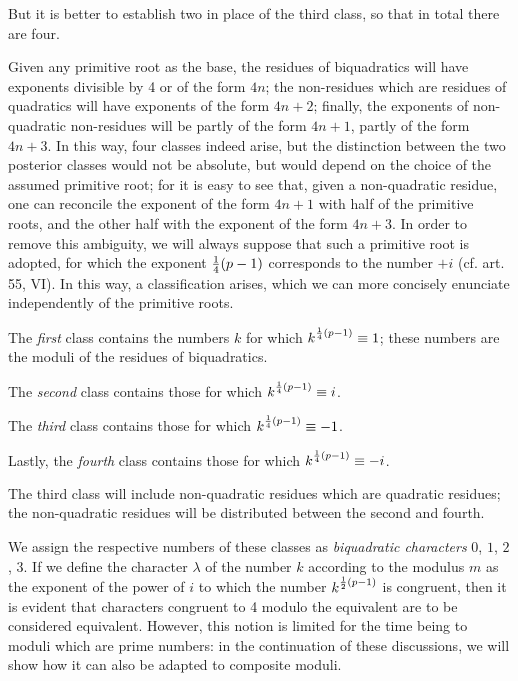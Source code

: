 \documentclass[twoside,12pt, showframe]{memoir}
\let\oldfrac\frac
\def\frac#1#2{\mathchoice{\tfrac{#1}{#2}}{\oldfrac{#1}{#2}}{\genfrac{}{}{}{2}{#1}{#2\mathstrut}}{\genfrac{}{}{}{3}{#1}{#2\mathstrut}}}
\begin{document}
But it is better to establish two in place of the third class, so that in total there are four.

Given any primitive root as the base, the residues of biquadratics will have exponents divisible by 4 or of the form \(4n\); the non-residues which are residues of quadratics will have exponents of the form \(4n+2\); finally, the exponents of non-quadratic non-residues will be partly of the form \(4n+1\), partly of the form \(4n+3\). In this way, four classes indeed arise, but the distinction between the two posterior classes would not be absolute, but would depend on the choice of the assumed primitive root; for it is easy to see that, given a non-quadratic residue, one can reconcile the exponent of the form \(4n+1\) with half of the primitive roots, and the other half with the exponent of the form \(4n+3\). In order to remove this ambiguity, we will always suppose that such a primitive root is adopted, for which the exponent \(\frac{1}{4}(p-1)\) corresponds to the number \(+i\) (cf. art. 55, VI). In this way, a classification arises, which we can more concisely enunciate independently of the primitive roots.

The \textit{first} class contains the numbers \(k\) for which \(k^{\frac{1}{4}(p-1)} \equiv 1\); these numbers are the moduli of the residues of biquadratics.

The \textit{second} class contains those for which \(k^{\frac{1}{4}(p-1)} \equiv i\).

The \textit{third} class contains those for which \(k^{\frac{1}{4}(p-1)} \equiv-1\).

Lastly, the \textit{fourth} class contains those for which \(k^{\frac{1}{4}(p-1)} \equiv-i\).

The third class will include non-quadratic residues which are quadratic residues; the non-quadratic residues will be distributed between the second and fourth.

We assign the respective numbers of these classes as \textit{biquadratic characters} \(0\), \(1\), \(2\), \(3\). If we define the character \(\lambda\) of the number \(k\) according to the modulus \(m\) as the exponent of the power of \(i\) to which the number \(k^{\frac{1}{2}(p-1)}\) is congruent, then it is evident that characters congruent to 4 modulo the equivalent are to be considered equivalent. However, this notion is limited for the time being to moduli which are prime numbers: in the continuation of these discussions, we will show how it can also be adapted to composite moduli.
%
\end{document}
